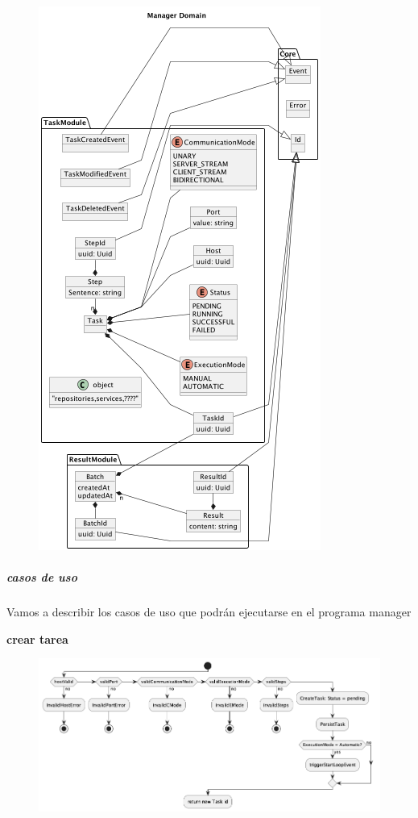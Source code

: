 \begin{figure}[H]
    \centering
    \includegraphics[height=0.4\textheight]{part/memoria_descriptiva/managerDomain}
    \caption[Diagrama de objetos de dominio]{}\label{fig:managerDomain}
\end{figure}



\subparagraph{casos de uso}

Vamos a describir los casos de uso que podrán ejecutarse en el programa manager

\textbf{crear tarea}

\begin{figure}[H]
    \centering
    \includegraphics[height=0.3\textheight]{part/memoria_descriptiva/createTaskUseCase}
    \caption[Diagrama de objetos de dominio]{}\label{fig:createTaskUseCase}
\end{figure}

